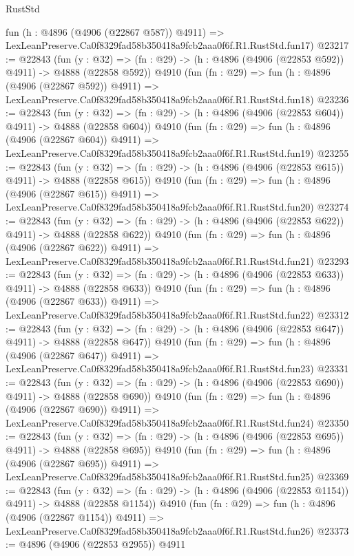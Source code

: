 \begin{lexlean}{RustStd}
\begin{coremodule}
    fun (h : @4896 (@4906 (@22867 @587)) @4911) =>
    LexLeanPreserve.Ca0f8329fad58b350418a9fcb2aaa0f6f.R1.RustStd.fun17)
@23217 := @22843
    (fun (y : @32) => (fn : @29) -> (h : @4896 (@4906 (@22853 @592)) @4911) -> @4888 (@22858 @592))
    @4910
    (fun (fn : @29) =>
    fun (h : @4896 (@4906 (@22867 @592)) @4911) =>
    LexLeanPreserve.Ca0f8329fad58b350418a9fcb2aaa0f6f.R1.RustStd.fun18)
@23236 := @22843
    (fun (y : @32) => (fn : @29) -> (h : @4896 (@4906 (@22853 @604)) @4911) -> @4888 (@22858 @604))
    @4910
    (fun (fn : @29) =>
    fun (h : @4896 (@4906 (@22867 @604)) @4911) =>
    LexLeanPreserve.Ca0f8329fad58b350418a9fcb2aaa0f6f.R1.RustStd.fun19)
@23255 := @22843
    (fun (y : @32) => (fn : @29) -> (h : @4896 (@4906 (@22853 @615)) @4911) -> @4888 (@22858 @615))
    @4910
    (fun (fn : @29) =>
    fun (h : @4896 (@4906 (@22867 @615)) @4911) =>
    LexLeanPreserve.Ca0f8329fad58b350418a9fcb2aaa0f6f.R1.RustStd.fun20)
@23274 := @22843
    (fun (y : @32) => (fn : @29) -> (h : @4896 (@4906 (@22853 @622)) @4911) -> @4888 (@22858 @622))
    @4910
    (fun (fn : @29) =>
    fun (h : @4896 (@4906 (@22867 @622)) @4911) =>
    LexLeanPreserve.Ca0f8329fad58b350418a9fcb2aaa0f6f.R1.RustStd.fun21)
@23293 := @22843
    (fun (y : @32) => (fn : @29) -> (h : @4896 (@4906 (@22853 @633)) @4911) -> @4888 (@22858 @633))
    @4910
    (fun (fn : @29) =>
    fun (h : @4896 (@4906 (@22867 @633)) @4911) =>
    LexLeanPreserve.Ca0f8329fad58b350418a9fcb2aaa0f6f.R1.RustStd.fun22)
@23312 := @22843
    (fun (y : @32) => (fn : @29) -> (h : @4896 (@4906 (@22853 @647)) @4911) -> @4888 (@22858 @647))
    @4910
    (fun (fn : @29) =>
    fun (h : @4896 (@4906 (@22867 @647)) @4911) =>
    LexLeanPreserve.Ca0f8329fad58b350418a9fcb2aaa0f6f.R1.RustStd.fun23)
@23331 := @22843
    (fun (y : @32) => (fn : @29) -> (h : @4896 (@4906 (@22853 @690)) @4911) -> @4888 (@22858 @690))
    @4910
    (fun (fn : @29) =>
    fun (h : @4896 (@4906 (@22867 @690)) @4911) =>
    LexLeanPreserve.Ca0f8329fad58b350418a9fcb2aaa0f6f.R1.RustStd.fun24)
@23350 := @22843
    (fun (y : @32) => (fn : @29) -> (h : @4896 (@4906 (@22853 @695)) @4911) -> @4888 (@22858 @695))
    @4910
    (fun (fn : @29) =>
    fun (h : @4896 (@4906 (@22867 @695)) @4911) =>
    LexLeanPreserve.Ca0f8329fad58b350418a9fcb2aaa0f6f.R1.RustStd.fun25)
@23369 := @22843
    (fun (y : @32) =>
    (fn : @29) -> (h : @4896 (@4906 (@22853 @1154)) @4911) -> @4888 (@22858 @1154))
    @4910
    (fun (fn : @29) =>
    fun (h : @4896 (@4906 (@22867 @1154)) @4911) =>
    LexLeanPreserve.Ca0f8329fad58b350418a9fcb2aaa0f6f.R1.RustStd.fun26)
@23373 := @4896 (@4906 (@22853 @2955)) @4911

\end{coremodule}
\end{lexlean}
